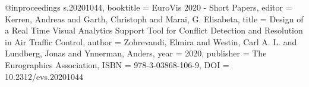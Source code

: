 @inproceedings {s.20201044,
booktitle = {EuroVis 2020 - Short Papers},
editor = {Kerren, Andreas and Garth, Christoph and Marai, G. Elisabeta},
title = {{Design of a Real Time Visual Analytics Support Tool for Conflict Detection and Resolution in Air Traffic Control}},
author = {Zohrevandi, Elmira and Westin, Carl A. L. and Lundberg, Jonas and Ynnerman, Anders},
year = {2020},
publisher = {The Eurographics Association},
ISBN = {978-3-03868-106-9},
DOI = {10.2312/evs.20201044}
}